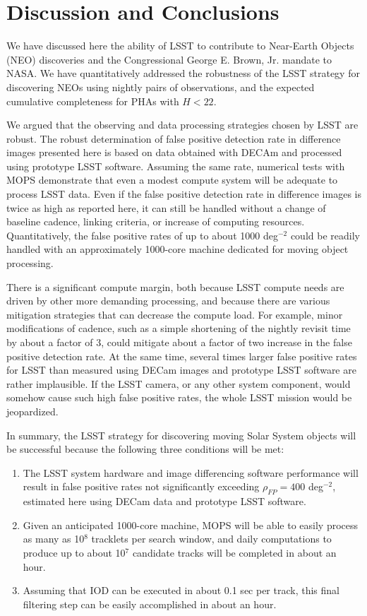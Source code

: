 

\section{Discussion and Conclusions}

We have discussed here the ability of LSST to contribute to Near-Earth Objects (NEO) discoveries and
the Congressional George E. Brown, Jr. mandate to NASA. We have quantitatively addressed
the robustness of the LSST strategy for discovering NEOs using nightly pairs of observations, and
the expected cumulative completeness for PHAs with $H<22$.

We argued that the observing and data processing strategies chosen by LSST are robust. The
robust determination of false positive detection rate in difference images presented here is based
on data obtained with DECAm and processed using prototype LSST software. Assuming the same rate,
numerical tests with MOPS demonstrate that even a modest compute system will be adequate to
process LSST data. Even if the false positive detection rate in difference images is twice as high as
reported here, it can still be handled without a change of baseline cadence, linking criteria, or
increase of computing resources. Quantitatively, the false positive rates of up to about
1000 deg$^{-2}$ could be readily handled with an approximately 1000-core machine dedicated for
moving object processing.

There is a significant compute margin, both because LSST compute needs are driven by other more
demanding processing, and because there are various mitigation strategies that can decrease the
compute load. For example, minor modifications of cadence, such as a simple shortening
of the nightly revisit time by about a factor of 3, could mitigate about a factor of two increase in
the false positive detection rate. At the same time, several times larger false positive rates for LSST
than measured using DECam images and prototype LSST software are rather implausible. If the
LSST camera, or any other system component, would somehow cause such high false positive rates,
the whole LSST mission would be jeopardized.

In summary, the LSST strategy for discovering moving Solar System objects will be successful
because the following three conditions will be met:
\begin{enumerate}
\item The LSST system hardware and image differencing software performance will result in false positive
          rates not significantly exceeding $\rho_{FP} =  400$ deg$^{-2}$, estimated here using DECam data
          and prototype LSST software.
\item Given an anticipated 1000-core machine, MOPS will be able to easily process as many as
         10$^8$ tracklets per search window, and daily computations to produce up to about 10$^7$
         candidate tracks will be completed in about an hour.
\item Assuming that IOD can be executed in about 0.1 sec per track, this final filtering step can
         be easily accomplished in about an hour.
\end{enumerate}


